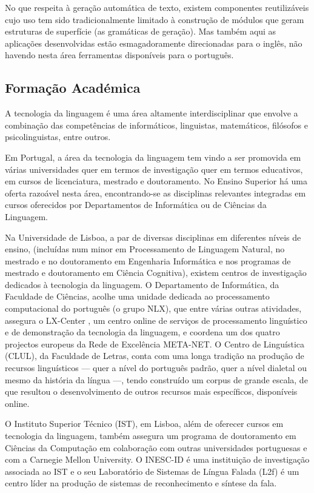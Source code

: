 \begin{multicols}{2}
No que respeita à geração automática de texto, existem componentes reutilizáveis cujo 
uso tem sido tradicionalmente limitado à construção de módulos que geram estruturas de superfície 
(as gramáticas de geração).  Mas também aqui as aplicações desenvolvidas estão 
esmagadoramente direcionadas para o inglês, não havendo nesta área ferramentas disponíveis 
para o português.


\subsection{Formação Académica}

A  tecnologia da linguagem é uma área altamente interdisciplinar que envolve a combinação
das competências de informáticos, linguistas, matemáticos, filósofos e psicolinguistas, entre outros. 

Em Portugal, a área da tecnologia da linguagem tem vindo a ser promovida em várias universidades
quer em termos de investigação quer em termos educativos, em cursos de licenciatura, mestrado e doutoramento. 
No  Ensino Superior há uma oferta razoável nesta área, encontrando-se as disciplinas relevantes 
integradas em cursos oferecidos por Departamentos de Informática ou de Ciências da Linguagem.

Na Universidade de Lisboa, a par de diversas disciplinas em diferentes níveis de ensino,
(incluídas num minor em Processamento de Linguagem Natural,
no mestrado e no doutoramento em Engenharia Informática 
e nos programas de mestrado e doutoramento em Ciência Cognitiva), 
existem centros de investigação dedicados à tecnologia da linguagem. 
O Departamento de Informática, da Faculdade de Ciências, acolhe uma unidade dedicada ao processamento computacional do português (o grupo NLX), 
que entre várias outras atividades, assegura o LX-Center \cite{lxcenter}, 
um centro online de serviços de processamento linguístico e de demonstração da tecnologia da linguagem,
e coordena um dos quatro projectos europeus da Rede de Excelência META-NET. 
O Centro de Linguística (CLUL), da Faculdade de Letras, conta com uma longa tradição na produção de recursos linguísticos 
--- quer a nível do português padrão, quer a nível dialetal ou mesmo da história da língua ---, 
tendo construído um corpus de grande escala, de que resultou o desenvolvimento de outros recursos mais específicos, 
disponíveis online.

O Instituto Superior Técnico (IST), em Lisboa, além de oferecer cursos em tecnologia da linguagem, 
também assegura um programa de doutoramento em Ciências da Computação em colaboração com outras universidades 
portuguesas e com a Carnegie Mellon University. 
O INESC-ID é uma instituição de investigação associada ao IST e o seu Laboratório de Sistemas de Língua Falada (L2f) 
é um centro líder na produção de sistemas de reconhecimento e síntese da fala.


\end{multicols}

